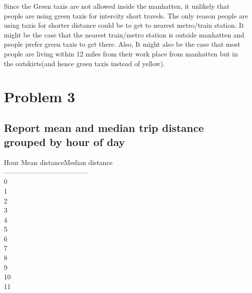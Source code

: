 \documentclass[letterpaper, 11pt]{article}
\begin{document}
Since the Green taxis are not allowed inside the manhatten, it unlikely that people are using green taxis for intercity short travels. The only reason people are using taxis for shorter distance could be to get to nearest metro/train station. It might be the case that the nearest train/metro station is outside manhatten and people prefer green taxis to get there. Also, It might also be the case that most people are living within 12 miles from their work place from manhatten but in the outskirts(and hence green taxis instead of yellow). 

\newpage
\section*{ Problem 3 }
\subsection*{Report mean and median trip distance grouped by hour of day}
Hour \quad    Mean distance\quad   Median distance\\
------\quad  ---------------\quad  -----------------\\
0\quad\quad\quad{}\quad\quad\quad{}\\
1          \quad\quad\quad{}               \quad\quad\quad{}\\
2          \quad\quad\quad{}               \quad\quad\quad{}\\
3          \quad\quad\quad{}               \quad\quad\quad{}\\
4          \quad\quad\quad{}               \quad\quad\quad{}\\
5          \quad\quad\quad{}               \quad\quad\quad{}\\
6          \quad\quad\quad{}               \quad\quad\quad{}\\
7          \quad\quad\quad{}               \quad\quad\quad{}\\
8          \quad\quad\quad{}               \quad\quad\quad{}\\
9          \quad\quad\quad{}               \quad\quad\quad{}\\
10          \quad\quad\quad{}               \quad\quad\quad{}\\
11          \quad\quad\quad{}               \quad\quad\quad{}\\
\end{document}
